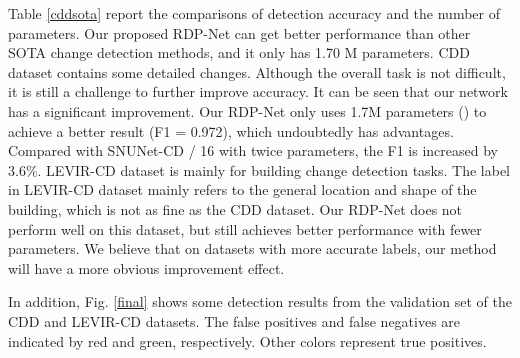 \documentclass[lettersize,journal]{IEEEtran}
\begin{document}
Table \ref{cddsota} report the comparisons of detection accuracy and the number of parameters.
Our proposed RDP-Net can get better performance than other SOTA change detection methods, and it only has 1.70 M parameters.
CDD dataset contains some detailed changes. Although the overall task is not difficult, it is still a challenge to further improve accuracy.
It can be seen that our network has a significant improvement.
Our RDP-Net only uses 1.7M parameters () to achieve a better result (F1 = 0.972), which undoubtedly has advantages.
Compared with SNUNet-CD / 16 with twice parameters, the F1 is increased by 3.6\%.
LEVIR-CD dataset is mainly for building change detection tasks.
The label in LEVIR-CD dataset mainly refers to the general location and shape of the building, which is not as fine as the CDD dataset.
Our RDP-Net does not perform well on this dataset, but still achieves better performance with fewer parameters.
We believe that on datasets with more accurate labels, our method will have a more obvious improvement effect.

In addition, Fig. \ref{final} shows some detection results from the validation set of the CDD and LEVIR-CD datasets.
The false positives and false negatives are indicated by red and green, respectively.
Other colors represent true positives.

\begin{figure*}[!t]
\centering
{}

\caption{(a)-(g) are results on CDD dataset.
(h)-(n) are results on LEVIR-CD dataset.
(a), (b), (h) and (i) are the original images.
(c) and (j) are the ground truth.
The results of (d) (k) FC-Siam-diff,
(e) (l) UNet++\_MSOF with 32 channels,
(f) (m) SNUNet-CD with 32 channels,
(g) (n) our RDP-Net.
The false positives and false negatives are indicated by red and green, respectively.
Other colors represent true positives.}
\label{final}
\end{figure*}
\end{document}
